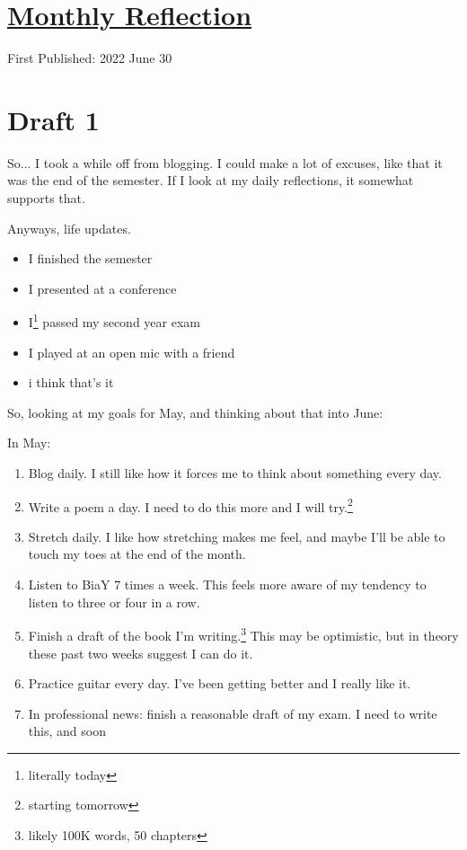 \documentclass[12pt]{article}[titlepage]
\renewcommand{\,}{\textsuperscript{,}}
\begin{document}
\doublespacing
\section{\href{reflection-june-2022.html}{Monthly Reflection}}
First Published: 2022 June 30

\section{Draft 1}
So... I took a while off from blogging.
I could make a lot of excuses, like that it was the end of the semester.
If I look at my daily reflections, it somewhat supports that.

Anyways, life updates.

\begin{itemize}
\item I finished the semester
\item I presented at a conference
\item I\footnote{literally today} passed my second year exam
\item I played at an open mic with a friend
\item i think that's it
\end{itemize}

So, looking at my goals for May, and thinking about that into June:

In May:
\begin{enumerate}
\item Blog daily. I still like how it forces me to think about something every day.
\item Write a poem a day. I need to do this more and I will try.\footnote{starting tomorrow}
\item Stretch daily. I like how stretching makes me feel, and maybe I'll be able to touch my toes at the end of the month.
\item Listen to BiaY 7 times a week. This feels more aware of my tendency to listen to three or four in a row.
\item Finish a draft of the book I'm writing.\footnote{likely 100K words, 50 chapters} This may be optimistic, but in theory these past two weeks suggest I can do it.
\item Practice guitar every day. I've been getting better and I really like it.
\item In professional news: finish a reasonable draft of my exam. I need to write this, and soon
\end{enumerate}
\end{document}
